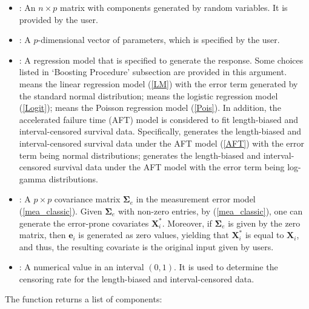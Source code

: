 \begin{itemize}
    \item {}: An $n\times p$ matrix with components generated by random variables. It is  provided by {the user}.
    
    \item {}: A $p$-dimensional vector of parameters, which is specified by {the user}.
    
    \item {}: A regression model that is specified to generate the response. Some choices listed in `Boosting Procedure' subsection are provided in this argument.     means the linear regression model (\ref{LM}) with the error term generated by the standard normal distribution;  means the logistic regression model (\ref{Logit});  means the Poisson regression model (\ref{Pois}). In addition, the accelerated failure time (AFT) model is considered to fit length-biased and interval-censored survival data. Specifically,  generates the length-biased and interval-censored survival data under the AFT model (\ref{AFT}) with the error term being normal distributions;  generates the length-biased and interval-censored survival data under the AFT model with the error term being log-gamma distributions.
    
    \item {}: A $p \times p$ covariance matrix $\boldsymbol{\Sigma}_e$ in the measurement error model (\ref{mea_classic}). Given $\boldsymbol{\Sigma}_e$ with non-zero entries, by (\ref{mea_classic}), one can generate the error-prone covariates $\mathbf{X}_i^\ast$. Moreover, if $\boldsymbol{\Sigma}_e$ is given by the zero matrix, then $\mathbf{e}_i$ is generated as zero values, yielding that $\mathbf{X}_i^\ast$ is equal to $\mathbf{X}_i$, and thus, the resulting covariate is the original input given by users.
    
    \item {}: A numerical value in an interval $(0,1)$. It is used to determine the censoring rate for the length-biased and interval-censored data.
    
\end{itemize}

The function  returns a list of components:

